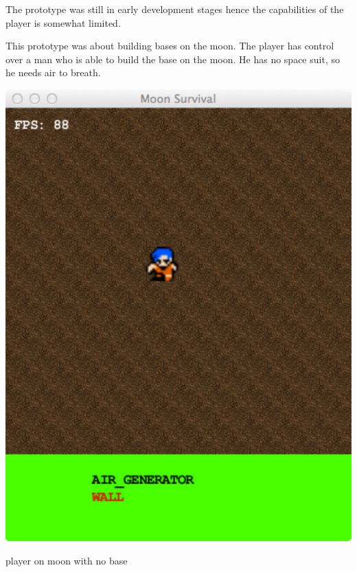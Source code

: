 




The prototype was still in early development stages hence the capabilities of the player is somewhat limited.


This prototype was about building bases on the moon.
The player has control over a man who is able to build the base on the moon.
He has no space suit, so he needs air to breath.

\begin{marginfigure}
	\includegraphics{res/space_base_prototype/no_base.pdf}
	\caption{
	player on moon with no base
	}
	\label{fig:SpaceBaseNoRoom}
\end{marginfigure}

